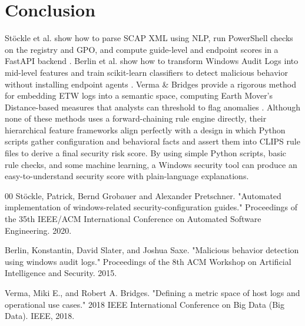\documentclass[conference, letterpaper]{IEEEtran}
\begin{document}
    \section{Conclusion}
    Stöckle et al. show how to parse SCAP XML using NLP, run PowerShell checks on the registry and GPO, and compute guide-level and endpoint scores in a FastAPI backend \cite{b1}. Berlin et al. show how to transform Windows Audit Logs into mid-level features and train scikit-learn classifiers to detect malicious behavior without installing endpoint agents \cite{b2}. Verma \& Bridges provide a rigorous method for embedding ETW logs into a semantic space, computing Earth Mover's Distance-based measures that analysts can threshold to flag anomalies \cite{b3}. Although none of these methods uses a forward-chaining rule engine directly, their hierarchical feature frameworks align perfectly with a design in which Python scripts gather configuration and behavioral facts and assert them into CLIPS rule files to derive a final security risk score. By using simple Python scripts, basic rule checks, and some machine learning, a Windows security tool can produce an easy-to-understand security score with plain-language explanations.

    \begin{thebibliography}{00}
         Stöckle, Patrick, Bernd Grobauer and Alexander Pretschner. "Automated implementation of windows-related security-configuration guides." Proceedings of the 35th IEEE/ACM International Conference on Automated Software Engineering. 2020.

         Berlin, Konstantin, David Slater, and Joshua Saxe. "Malicious behavior detection using windows audit logs." Proceedings of the 8th ACM Workshop on Artificial Intelligence and Security. 2015.

         Verma, Miki E., and Robert A. Bridges. "Defining a metric space of host logs and operational use cases." 2018 IEEE International Conference on Big Data (Big Data). IEEE, 2018.
    \end{thebibliography}
\end{document}
